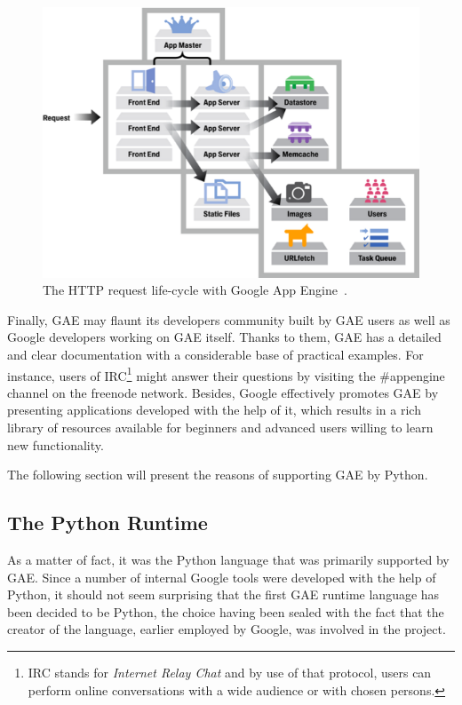 \begin{figure}[ht]
\begin{center}
\includegraphics[scale=0.4]{img/gae_request.png}
\caption{The HTTP request life-cycle with Google App Engine~\cite{gae_request_cycle}.}
\label{fig:gae_request_cycle}
\end{center}
\end{figure}

Finally, GAE may flaunt its developers community built by GAE users as well as Google developers working on GAE itself. Thanks to them, GAE has a detailed and clear documentation with a considerable base of practical examples. For instance, users of IRC\footnote{IRC stands for \textit{Internet Relay Chat} and by use of that protocol, users can perform online conversations with a wide audience or with chosen persons.} might answer their questions by visiting the \#appengine channel on the freenode network. Besides, Google effectively promotes GAE by presenting applications developed with the help of it, which results in a rich library of resources available for beginners and advanced users willing to learn new functionality.

The following section will present the reasons of supporting GAE by Python. 
  
  
\subsection{The Python Runtime}\label{subsec:gae_py}
As a matter of fact, it was the Python language that was primarily supported by GAE. Since a number of internal Google tools were developed with the help of Python, it should not seem surprising that the first GAE runtime language has been decided to be Python, the choice having been sealed with the fact that the creator of the language, earlier employed by Google, was involved in the project.


